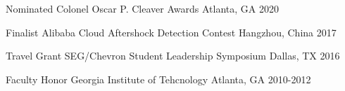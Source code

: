 \begin{cvhonors}

  \cvhonor
    {Nominated} %
    {Colonel Oscar P. Cleaver Awards} %
    {Atlanta, GA} %
    {2020} %
    
  \cvhonor
    {Finalist} %
    {Alibaba Cloud Aftershock Detection Contest} %
    {Hangzhou, China} %
    {2017} %

  \cvhonor
    {Travel Grant} %
    {SEG/Chevron Student Leadership Symposium} %
    {Dallas, TX} %
    {2016} %

  \cvhonor
    {Faculty Honor} %
    {Georgia Institute of Tehcnology} %
    {Atlanta, GA} %
    {2010-2012} %




\end{cvhonors}
